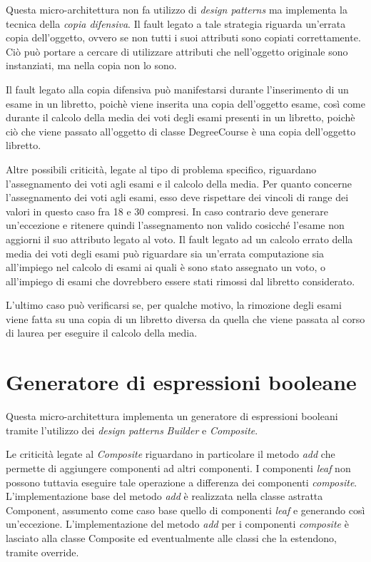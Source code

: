 Questa micro-architettura non fa utilizzo di \emph{design patterns} ma implementa la tecnica della \emph{copia difensiva}. Il fault legato a tale strategia riguarda un'errata copia dell'oggetto, ovvero se non tutti i suoi attributi sono copiati correttamente. Ciò può portare a cercare di utilizzare attributi che nell'oggetto originale sono instanziati, ma nella copia non lo sono.

Il fault legato alla copia difensiva può manifestarsi durante l'inserimento di un esame in un libretto, poichè viene inserita una copia dell'oggetto esame, così come durante il calcolo della media dei voti degli esami presenti in un libretto, poichè ciò che viene passato all'oggetto di classe DegreeCourse è una copia dell'oggetto libretto.

Altre possibili criticità, legate al tipo di problema specifico, riguardano l'assegnamento dei voti agli esami e il calcolo della media.
Per quanto concerne l'assegnamento dei voti agli esami, esso deve rispettare dei vincoli di range dei valori in questo caso fra 18 e 30 compresi. In caso contrario deve generare un'eccezione e ritenere quindi l'assegnamento non valido cosicché l'esame non aggiorni il suo attributo legato al voto.
Il fault legato ad un calcolo errato della media dei voti degli esami può riguardare sia un'errata computazione sia all'impiego nel calcolo di esami ai quali è sono stato assegnato un voto, o all'impiego di esami che dovrebbero essere stati rimossi dal libretto considerato.

L'ultimo caso può verificarsi se, per qualche motivo, la rimozione degli esami viene fatta su una copia di un libretto diversa da quella che viene passata al corso di laurea per eseguire il calcolo della media.


\section{Generatore di espressioni booleane}

Questa micro-architettura implementa un generatore di espressioni booleani tramite l'utilizzo dei \emph{design patterns} \emph{Builder} e \emph{Composite}.

Le criticità legate al \emph{Composite} riguardano in particolare il metodo \textit{add} che permette di aggiungere componenti ad altri componenti. I componenti \emph{leaf} non possono tuttavia eseguire tale operazione a differenza dei componenti \emph{composite}. L'implementazione base del metodo \emph{add} è realizzata nella classe astratta Component, assumento come caso base quello di componenti \emph{leaf} e generando così un'eccezione. L'implementazione del metodo \emph{add} per i componenti \emph{composite} è lasciato alla classe Composite ed eventualmente alle classi che la estendono, tramite override.

